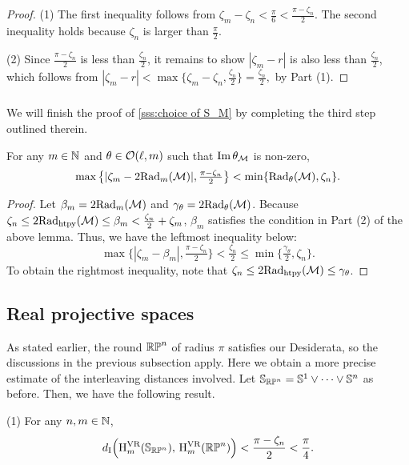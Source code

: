 \begin{proof}
	(1) The first inequality follows from $\zeta_m - \zeta_n < \tfrac{\pi}{6} < \tfrac{\pi - \zeta_n}{2}$.
	The second inequality holds because $\zeta_n$ is larger than $\tfrac{\pi}{2}$.

	(2) Since $\tfrac{\pi - \zeta_n}{2}$ is less than $\tfrac{\zeta_n}{2}$, it remains to show $|\zeta_m - r |$ is also less than $\tfrac{\zeta_n}{2}$, which follows from
	\(
	|\zeta_m - r | < \max\big\{\zeta_m - \zeta_n, \tfrac{\zeta_n}{2}\big\} = \tfrac{\zeta_n}{2},
	\) by Part (1).
\end{proof}

\subsubsection{}\label{sss:comparison_lemma_zeta_n}

We will finish the proof of \cref{sss:choice of S_M} by completing the third step outlined therein.

\lemma
For any $m \in \mathbb{N}$ and $\theta \in \mathcal{O}(\ell, m)$ such that $\operatorname{Im} \theta_{\mathcal{M}}$ is non-zero,
\[\max\big\{|\zeta_m - 2\mathrm{Rad}_{m}(\mathcal{M}) |, \tfrac{\pi - \zeta_n}{2}\big\} < \min\{\mathrm{Rad}_{\theta}(\mathcal{M}), \zeta_n\}.\]
\begin{proof}
	Let $\beta_m = 2\mathrm{Rad}_{m}(\mathcal{M})$ and $\gamma_\theta = 2\mathrm{Rad}_{\theta}(\mathcal{M})$.
	Because \(\zeta_n \leq 2\mathrm{Rad}_{\mathrm{htpy}}(\mathcal{M}) \leq \beta_m < \tfrac{\zeta_n}{2} + \zeta_m\), $\beta_m$ satisfies the condition in Part (2) of the above lemma.
	Thus, we have the leftmost inequality below:
	\[
	\max\big\{|\zeta_m - \beta_m|, \tfrac{\pi - \zeta_n}{2}\big\} < \tfrac{\zeta_n}{2}
	\leq
	\min\big\{\tfrac{\gamma_\theta}{2}, \zeta_n\big\}.
	\]
	To obtain the rightmost inequality, note that \(\zeta_n \leq 2\mathrm{Rad}_{\mathrm{htpy}}(\mathcal{M}) \leq \gamma_\theta\).
\end{proof}

\subsection{Real projective spaces}\label{ss:distance_estimate_rpn}

As stated earlier, the round \(\mathbb{RP}^n\) of radius \(\pi\) satisfies our Desiderata, so the discussions in the previous subsection apply.
Here we obtain a more precise estimate of the interleaving distances involved.
Let \(\mathbb{S}_{\mathbb{RP}^n} = \mathbb{S}^1 \vee \dots \vee \mathbb{S}^n\) as before.
Then, we have the following result.

\theorem
(1) For any \(n,m \in \mathbb{N}\),
\[
d_{\mathrm{I}}\Big(\mathrm{H}^{\mathrm{VR}}_m(\mathbb{S}_{\mathbb{RP}^n}),\, \mathrm{H}^{\mathrm{VR}}_m(\mathbb{RP}^n)\Big) < \frac{\pi - \zeta_n}{2} < \frac{\pi}{4}.
\]

